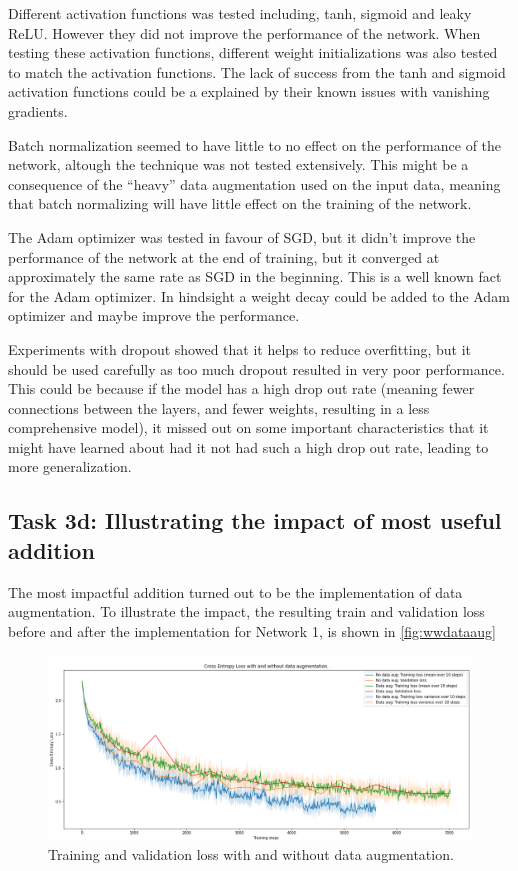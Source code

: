 \documentclass{article}
\begin{document}
Different activation functions was tested including, tanh, sigmoid and leaky ReLU. However they did not improve the performance of the network. When testing these activation functions, different weight initializations was also tested to match the activation functions. The lack of success from the tanh and sigmoid activation functions could be a explained by their known issues with vanishing gradients.

Batch normalization seemed to have little to no effect on the performance of the network, altough the technique was not tested extensively. This might be a consequence of the ``heavy'' data augmentation used on the input data, meaning that batch normalizing will have little effect on the training of the network.  

The Adam optimizer was tested in favour of SGD, but it didn't improve the performance of the network at the end of training, but it converged at approximately the same rate as SGD in the beginning. This is a well known fact for the Adam optimizer. In hindsight a weight decay could be added to the Adam optimizer and maybe improve the performance. 

Experiments with dropout showed that it helps to reduce overfitting, but it should be used carefully as too much dropout resulted in very poor performance. This could be because if the model has a high drop out rate (meaning fewer connections between the layers, and fewer weights, resulting in a less comprehensive model), it missed out on some important characteristics that it might have learned about had it not had such a high drop out rate, leading to more generalization.

\subsection{Task 3d: Illustrating the impact of most useful addition}

The most impactful addition turned out to be the implementation of data augmentation. To illustrate the impact, the resulting train and validation loss before and after the implementation for Network 1, is shown in \autoref{fig:wwdataaug}

\begin{figure}[H]
    \centering
    \includegraphics[width = \textwidth]{Assignments/Assignment_3/plots/task3d_plot.png}
    \caption{Training and validation loss with and without data augmentation.}
    \label{fig:wwdataaug}
\end{figure}
\end{document}
